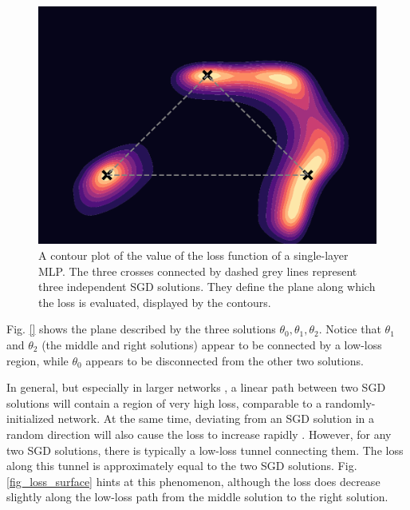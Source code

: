 \documentclass[12pt]{article}
\begin{document}
\begin{figure}[h]
\centering
\includegraphics[width=14cm]{plots/loss_landscape.pdf}
\caption{A contour plot of the value of the loss function of a single-layer MLP. The three crosses connected by dashed grey lines represent three independent SGD solutions. They define the plane along which the loss is evaluated, displayed by the contours.}
\label{fig_loss_landscape}
\end{figure}

Fig. \ref{} shows the plane described by the three solutions $\theta_0, \theta_1, \theta_2$. Notice that $\theta_1$ and $\theta_2$ (the middle and right solutions) appear to be connected by a low-loss region, while $\theta_0$ appears to be disconnected from the other two solutions.

In general, but especially in larger networks \cite{loss_surfaces}, a linear path between two SGD solutions will contain a region of very high loss, comparable to a randomly-initialized network. At the same time, deviating from an SGD solution in a random direction will also cause the loss to increase rapidly \cite{swag}. However, for any two SGD solutions, there is typically a low-loss tunnel connecting them. The loss along this tunnel is approximately equal to the two SGD solutions. \cite{mode_connect} Fig. \ref{fig_loss_surface} hints at this phenomenon, although the loss does decrease slightly along the low-loss path from the middle solution to the right solution.
\end{document}
